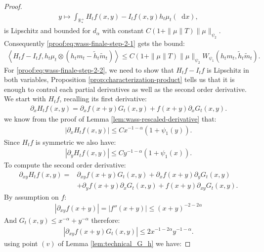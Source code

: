 \documentclass[11pt,a4paper]{article}
\newcommand{\RRP}{\mathbb{R}^+_*}
\newcommand{\brac}[1]{\left\langle#1\right\rangle}
\newcommand{\dd}{\mathop{}\!\mathrm{d}}
\begin{document}
\begin{proof}
    \begin{align*}
        y \mapsto \int_{\RRP} H_tf(x,y)- I_tf(x,y) h_t\mu_t(\dd x), 
    \end{align*}
    is Lipschitz and bounded for $d_\alpha$ with constant $C(1 + \|\mu\|T)\|\mu\|_{\psi_2}$. Consequently \eqref{proof:eq:wass-finale-step-2-1} gets the bound:
    \begin{align*}
        \brac{H_tf- I_tf ,h_t\mu_t \otimes \left(h_tm_t - \tilde{h}_t\tilde{m}_t \right) } \leq C(1 + \|\mu\|T)\|\mu\|_{\psi_2}W_{\psi_1}\left(h_tm_t , \tilde{h}_t\tilde{m}_t \right).
    \end{align*}
    For \eqref{proof:eq:wass-finale-step-2-2}, we need to show that $H_tf - I_tf$ is Lipschitz in both variables, Proposition \ref{prop:characterization-product} tells us that it is enough to control each partial derivatives as well as the second order  derivative. We start with $H_tf$, recalling its first derivative:
    \begin{align*}
        \partial_x H_tf(x,y) = \partial_x f(x+y) G_t(x,y) + f(x+y) \partial_x G_t(x,y).
    \end{align*}
    we know from the proof of Lemma \ref{lem:wass-rescaled-derivative} that:
    \begin{align*}
        \left|\partial_x H_tf(x,y)\right| \leq C x^{-1-\alpha} (1 + \psi_1(y)).
    \end{align*}
    Since $H_tf$ is symmetric we also have:
    \begin{align*}
        \left|\partial_y H_tf(x,y)\right| \leq C y^{-1-\alpha} (1 + \psi_1(x)).
    \end{align*}
    To compute the second order  derivative:
    \begin{align*}
        \partial_{xy} H_tf(x,y) 
        =&  \partial_{xy}f(x+y) G_t(x,y)+ \partial_x f(x+y) \partial_yG_t(x,y) \\
        &+ \partial_y f(x+y) \partial_xG_t(x,y)  + f(x+y )\partial_{xy} G_t(x,y).
    \end{align*}
    By assumption on $f$:
    \begin{align*}
        \left| \partial_{xy} f(x+y)\right| = \left|  f''(x+y)\right| \leq (x+y)^{-2-2\alpha}
    \end{align*}
    And $G_t(x,y) \leq x^{-\alpha} + y^{-\alpha}$ therefore:
    \begin{align*}
        \left|  \partial_{xy} f(x+y) G_t(x,y)\right| \leq 2 x^{-1-2\alpha}y^{-1-\alpha}.
    \end{align*}
    using point $(v)$ of Lemma \ref{lem:technical_G_h} we have:

\end{proof}
\end{document}
